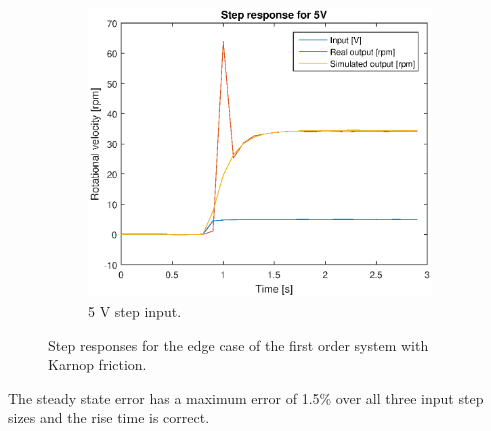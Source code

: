 \begin{figure}[H]
\begin{subfigure}[H]{0.48\textwidth}
    \includegraphics[width=\textwidth]{./img/testrig_5Vstep_no_i_fric.eps}
    \caption{5 V step input.}
    \end{subfigure}
    \caption{Step responses for the edge case of the first order system with
    Karnop friction.}
\end{figure}
The steady state error has a maximum error of 1.5\% over all three input step
sizes and the rise time is correct. %

